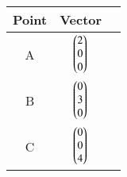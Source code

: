 \begin{tabular}[12pt]{ |c| c| c|} 
    \hline
    {Point} & {Vector} \\ 
    \hline
    A & $ \begin{pmatrix}2\\ 0\\0\end{pmatrix} $ \\
    \hline 
    B & $ \begin{pmatrix}0 \\ 3\\0\end{pmatrix} $  \\
    \hline
    C & $ \begin{pmatrix}0 \\ 0\\4\end{pmatrix} $   \\
    \hline  
    \end{tabular}
